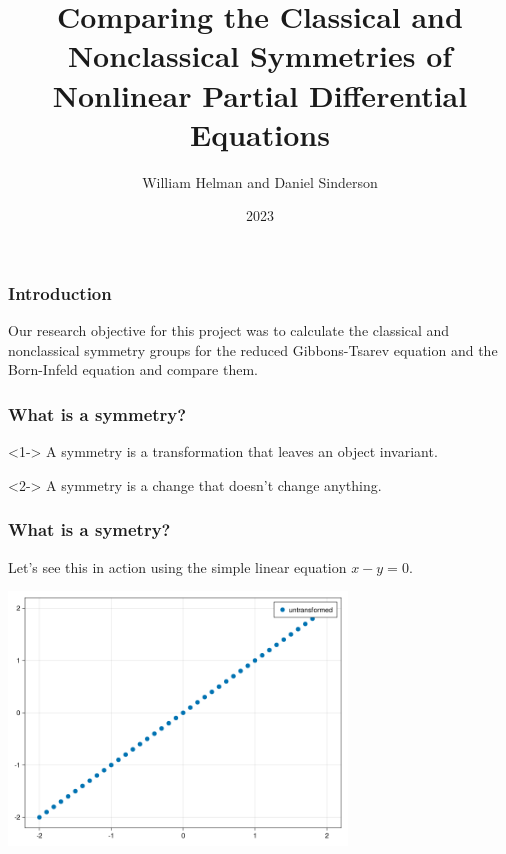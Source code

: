 \documentclass{beamer}
\title{Comparing the Classical and Nonclassical Symmetries of Nonlinear Partial Differential Equations}
\author{William Helman and Daniel Sinderson}
\institute{Southern Oregon University}
\date{2023}
\begin{document}
\frame{\titlepage}



\begin{frame}
    \frametitle{Introduction}
    Our research objective for this project was to calculate the classical and nonclassical symmetry groups for the reduced Gibbons-Tsarev equation and the Born-Infeld equation and compare them.
\end{frame}



\begin{frame}
    \frametitle{What is a symmetry?}
    \begin{definition}<1->
        A symmetry is a transformation that leaves an object invariant.
    \end{definition}
    \vspace*{0.5in}
    \begin{definition}<2->
        A symmetry is a change that doesn't change anything.
    \end{definition}
\end{frame}


\begin{frame}
    \frametitle{What is a symetry?}
    Let's see this in action using the simple linear equation $x-y=0$.\\
    \begin{center}
        \includegraphics[width=9cm]{y=x.png}
    \end{center}
\end{frame}
\end{document}
